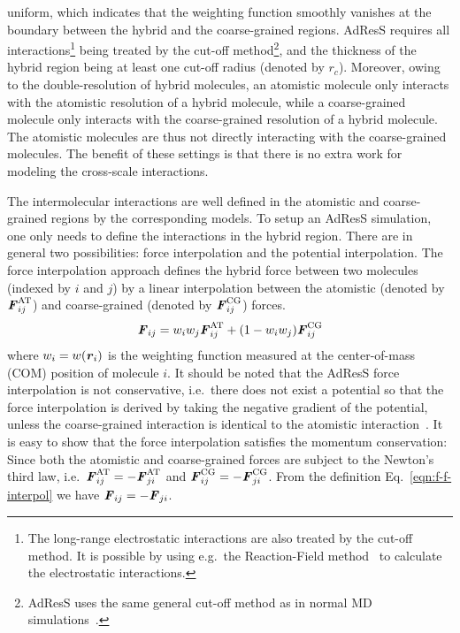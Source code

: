 \documentclass[epjST]{svjour}
\newcommand{\recheck}[1]{{\color{red} #1}}
\newcommand{\vect}[1]{\textbf{\textit{#1}}}
\newcommand{\AT}[0]{\textrm{AT}}
\newcommand{\CG}[0]{\textrm{CG}}
\newcommand{\moleidxone}[0]{i}
\newcommand{\moleidxtwo}[0]{j}
\begin{document}
uniform, which indicates that the weighting function smoothly vanishes
at the boundary between the hybrid and the coarse-grained regions.
AdResS requires 
all interactions\footnote{The long-range electrostatic interactions
  are also treated by the cut-off method. \recheck{It is possible by using e.g.~the Reaction-Field method~\cite{onsager1936electric,tironi1995generalized}
  to calculate the electrostatic interactions.}
} being treated
by the cut-off method\footnote{\recheck{AdResS uses the same general cut-off method as in normal MD simulations~\cite{frenkel2001understanding}.}}, and the thickness of
the hybrid region being at least one cut-off radius (denoted by $r_c$).
Moreover, owing to the double-resolution of hybrid molecules,
an atomistic molecule only interacts with the 
atomistic resolution of a hybrid molecule,
while a coarse-grained molecule only interacts with the coarse-grained resolution
of a hybrid molecule.
The atomistic molecules are thus not directly interacting with the coarse-grained molecules.
The benefit of these settings is that
there is no extra work for modeling the cross-scale interactions.

The intermolecular interactions are
well defined in the atomistic and coarse-grained regions by the corresponding models.
To setup an AdResS simulation, one only needs to define the
interactions in the hybrid region. There are in general two
possibilities: force interpolation and the potential interpolation.
The force interpolation approach defines the hybrid force between two
molecules (indexed by $\moleidxone$ and $\moleidxtwo$) by a linear interpolation
between the atomistic (denoted by ${\vect F}_{\moleidxone\moleidxtwo}^{\AT}$) and coarse-grained (denoted by ${\vect F}_{\moleidxone\moleidxtwo}^{\CG}$) forces.
\begin{align}\label{eqn:f-f-interpol}
  {\vect F}_{\moleidxone \moleidxtwo}=w_\moleidxone w_\moleidxtwo{\vect F}_{\moleidxone\moleidxtwo}^{\AT}+(1-w_\moleidxone w_\moleidxtwo){\vect F}^{\CG}_{\moleidxone\moleidxtwo} 
\end{align}
where $w_\moleidxone = w(\vect r_\moleidxone)$ is the weighting function
measured at the center-of-mass (COM) position of molecule $\moleidxone$.
It should be noted that the AdResS  force interpolation is not conservative, i.e.~there does not
exist a potential so that the force interpolation is derived by taking the negative gradient of the potential,
unless the coarse-grained interaction is identical to the atomistic interaction~\cite{praprotnik2011comment,dellesite2007some}.
It is easy to show that the force interpolation satisfies the momentum conservation: Since
both the atomistic and coarse-grained forces are subject to the Newton's third law, i.e.~${\vect F}_{\moleidxone\moleidxtwo}^{\AT} = - {\vect F}_{\moleidxtwo\moleidxone}^{\AT}$
and ${\vect F}_{\moleidxone\moleidxtwo}^{\CG} = - {\vect F}_{\moleidxtwo\moleidxone}^{\CG}$. From the definition Eq.~\eqref{eqn:f-f-interpol} we have ${\vect F}_{\moleidxone\moleidxtwo} = - {\vect F}_{\moleidxtwo\moleidxone}$.
\end{document}
